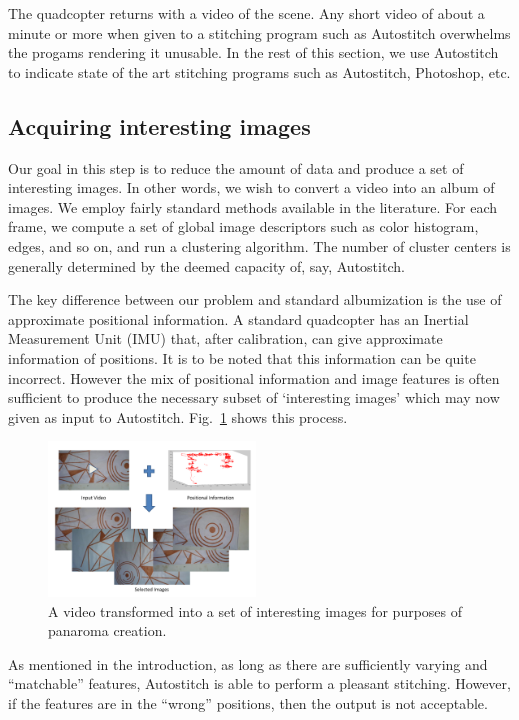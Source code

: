 \documentclass[10pt,twocolumn,letterpaper]{article}
\begin{document}
The quadcopter returns with a video of the scene.  Any short video of
about a minute or more when given to a stitching program such as
Autostitch overwhelms the progams rendering it unusable. In the rest
of this section, we use Autostitch to indicate state of the art
stitching programs such as Autostitch, Photoshop, etc.

\subsection{Acquiring interesting images}
Our goal in this step is to reduce the amount of data and produce a
set of interesting images.  In other words, we wish to convert a video
into an album of images.  We employ fairly standard methods available
in the literature.  For each frame, we compute a set of global image
descriptors such as color histogram, edges, and so on, and run a
clustering algorithm.  The number of cluster centers is generally
determined by the deemed capacity of, say, Autostitch.

The key difference between our problem and standard albumization is
the use of approximate positional information.  A standard quadcopter
has an Inertial Measurement Unit (IMU) that, after calibration, can
give  approximate information of positions.  It is to be noted that
this information can be quite incorrect.  However the mix of
positional information and image features is often sufficient to
produce the necessary subset of `interesting images' which may now
given as input to Autostitch. Fig.~\ref{fig:selection} shows this
process. 

\begin{figure}[h!]
  \centering
  \includegraphics[width=0.49\textwidth]{figures/selection} 
  \caption{ \label{fig:selection} A video transformed into a set of
    interesting images for purposes of panaroma creation.  }
\end{figure}    


As mentioned in the introduction, as long as there are sufficiently
varying and ``matchable'' features, Autostitch is able to perform a
pleasant stitching.  However, if the features are in the ``wrong''
positions, then the output is not acceptable.
\end{document}
